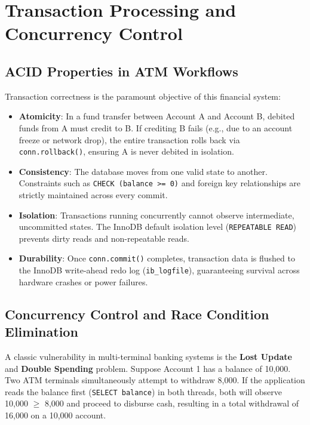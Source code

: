 \documentclass[11pt,a4paper]{report}
\begin{document}
\newpage

\section{Transaction Processing and Concurrency Control}

\subsection{ACID Properties in ATM Workflows}
Transaction correctness is the paramount objective of this financial system:
\begin{itemize}
    \item \textbf{Atomicity}: In a fund transfer between Account A and Account B, debited funds from A must credit to B. If crediting B fails (e.g., due to an account freeze or network drop), the entire transaction rolls back via \texttt{conn.rollback()}, ensuring A is never debited in isolation.
    \item \textbf{Consistency}: The database moves from one valid state to another. Constraints such as \texttt{CHECK (balance >= 0)} and foreign key relationships are strictly maintained across every commit.
    \item \textbf{Isolation}: Transactions running concurrently cannot observe intermediate, uncommitted states. The InnoDB default isolation level (\texttt{REPEATABLE READ}) prevents dirty reads and non-repeatable reads.
    \item \textbf{Durability}: Once \texttt{conn.commit()} completes, transaction data is flushed to the InnoDB write-ahead redo log (\texttt{ib\_logfile}), guaranteeing survival across hardware crashes or power failures.
\end{itemize}

\subsection{Concurrency Control and Race Condition Elimination}
A classic vulnerability in multi-terminal banking systems is the \textbf{Lost Update} and \textbf{Double Spending} problem. 
Suppose Account 1 has a balance of 10,000. Two ATM terminals simultaneously attempt to withdraw 8,000.
If the application reads the balance first (\texttt{SELECT balance}) in both threads, both will observe 10,000 $\ge$ 8,000 and proceed to disburse cash, resulting in a total withdrawal of 16,000 on a 10,000 account.
\end{document}
